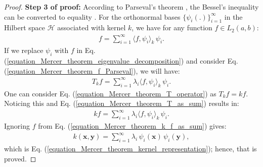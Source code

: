 \documentclass[lang=cn,10pt]{gorgeousnbook}
\numberwithin{equation}{section}%
\numberwithin{figure}{section}%
\begin{document}
\begin{proof}
\textbf{Step 3 of proof:} 
According to Parseval's theorem \cite{parseval1806memoires}, the Bessel's inequality can be converted to equality \cite{saxe2002beginning}. For the orthonormal bases $\{\psi_i(.)\}_{i=1}^\infty$ in the Hilbert space $\mathcal{H}$ associated with kernel $k$, we have for any function $f \in L_2(a,b)$:
\begin{align}\label{equation_Mercer_theorem_f_Parseval}
f = \sum_{i=1}^\infty \langle f, \psi_i \rangle_k\, \psi_i.
\end{align}
If we replace $\psi_i$ with $f$ in Eq. (\ref{equation_Mercer_theorem_eigenvalue_decomposition}) and consider Eq. (\ref{equation_Mercer_theorem_f_Parseval}), we will have:
\begin{align}\label{equation_Mercer_theorem_T_as_sum}
T_k f = \sum_{i=1}^\infty \lambda_i \langle f, \psi_i \rangle_k\, \psi_i.
\end{align}
One can consider Eq. (\ref{equation_Mercer_theorem_T_operator}) as $T_k f = k f$. Noticing this and Eq. (\ref{equation_Mercer_theorem_T_as_sum}) results in:
\begin{align}\label{equation_Mercer_theorem_k_f_as_sum}
k f = \sum_{i=1}^\infty \lambda_i \langle f, \psi_i \rangle_k\, \psi_i.
\end{align}
Ignoring $f$ from Eq. (\ref{equation_Mercer_theorem_k_f_as_sum}) gives:
\begin{align}
k(\boldsymbol{x}, \boldsymbol{y}) = \sum_{i=1}^\infty \lambda_i\, \psi_i(\boldsymbol{x})\, \psi_i(\boldsymbol{y}),
\end{align}
which is Eq. (\ref{equation_Mercer_theorem_kernel_representation}); hence, that is proved. 


\end{proof}
\end{document}
